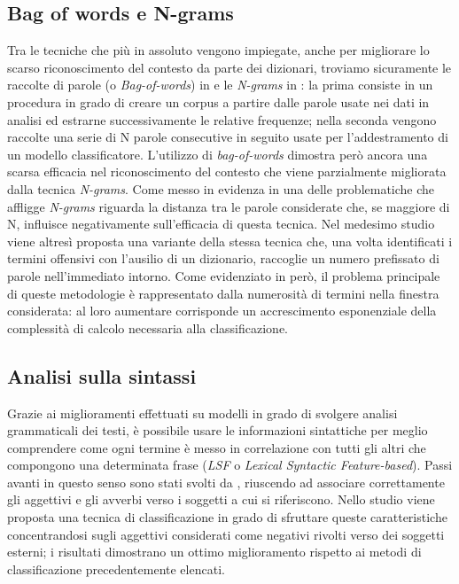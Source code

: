 \subsection{Bag of words e N-grams}

Tra le tecniche che più in assoluto vengono impiegate, anche per migliorare lo scarso riconoscimento del contesto da parte dei dizionari, troviamo sicuramente le raccolte di parole (o \textit{Bag-of-words}) in \cite{BOWPete,BOWGreevy,LocateHate} e le \textit{N-grams} in \cite{NgPinkesh,BOWPete,offensivelang,BOWGreevy,stem2,languagedetect,NgZeerak}: la prima consiste in un procedura in grado di creare un corpus a partire dalle parole usate nei dati in analisi ed estrarne successivamente le relative frequenze; nella seconda vengono raccolte una serie di N parole consecutive in seguito usate per l’addestramento di un modello classificatore. 
L’utilizzo di \textit{bag-of-words} dimostra però ancora una scarsa efficacia nel riconoscimento del contesto che viene parzialmente migliorata dalla tecnica \textit{N-grams}. Come messo in evidenza in \cite{BOWPete} una delle problematiche che affligge \textit{N-grams} riguarda la distanza tra le parole considerate che, se maggiore di N, influisce negativamente sull'efficacia di questa tecnica. 
Nel medesimo studio viene altresì proposta una variante della stessa tecnica che, una volta identificati i termini offensivi con l’ausilio di un dizionario, raccoglie un numero prefissato di parole nell’immediato intorno. Come evidenziato in \cite{Chen} però, il problema principale di queste metodologie è rappresentato dalla numerosità di termini nella finestra considerata: al loro aumentare corrisponde un accrescimento esponenziale della complessità di calcolo necessaria alla classificazione.

\subsection{Analisi sulla sintassi}

Grazie ai miglioramenti effettuati su modelli in grado di svolgere analisi grammaticali dei testi, è possibile usare le informazioni sintattiche per meglio comprendere come ogni termine è messo in correlazione con tutti gli altri che compongono una determinata frase (\textit{LSF} o \textit{Lexical Syntactic Feature-based}). Passi avanti in questo senso sono stati svolti da \cite{StanfordNLP}, riuscendo ad associare correttamente gli aggettivi e gli avverbi verso i soggetti a cui si riferiscono. Nello studio \cite{Chen} viene proposta una tecnica di classificazione in grado di sfruttare queste caratteristiche concentrandosi sugli aggettivi considerati come negativi rivolti verso dei soggetti esterni; i risultati dimostrano un ottimo miglioramento rispetto ai metodi di classificazione precedentemente elencati.

